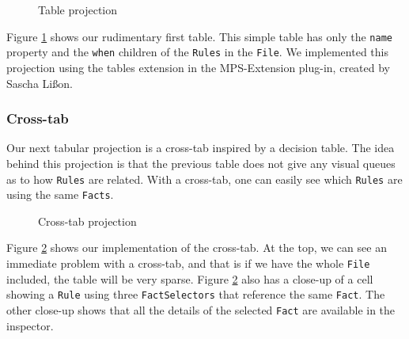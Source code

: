\begin{figure}[h]
    \centering
    \caption{Table projection}
    \label{fig:tableProjection1}
\end{figure}
Figure \ref{fig:tableProjection1} shows our rudimentary first table.
This simple table has only the \texttt{name} property and the \texttt{when} children of the \texttt{Rules} in the \texttt{File}.
We implemented this projection using the tables extension in the MPS-Extension plug-in, created by Sascha Lißon.

\subsubsection{Cross-tab}
Our next tabular projection is a cross-tab inspired by a decision table.
The idea behind this projection is that the previous table does not give any visual queues as to how \texttt{Rules} are related.
With a cross-tab, one can easily see which \texttt{Rules} are using the same \texttt{Facts}.

\begin{figure}[h]
    \centering
    \caption{Cross-tab projection}
    \label{fig:crosstabProjection1}
\end{figure}

Figure \ref{fig:crosstabProjection1} shows our implementation of the cross-tab.
At the top, we can see an immediate problem with a cross-tab, and that is if we have the whole \texttt{File} included, the table will be very sparse.
Figure \ref{fig:crosstabProjection1} also has a close-up of a cell showing a \texttt{Rule} using three \texttt{FactSelectors} that reference the same \texttt{Fact}.
The other close-up shows that all the details of the selected \texttt{Fact} are available in the inspector.

